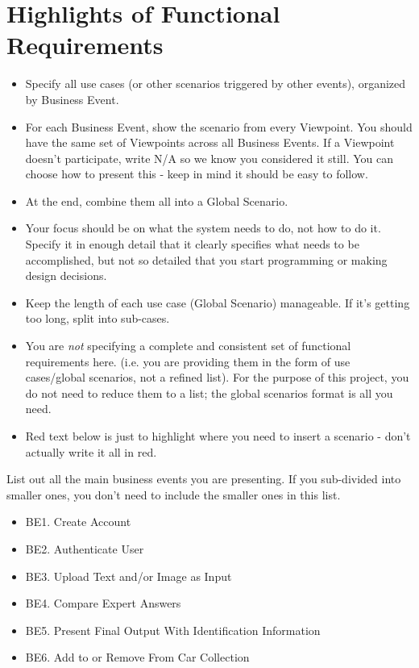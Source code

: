 \documentclass[]{article}
\begin{document}
\section{Highlights of Functional Requirements}
\label{sec:functional_requirements}
\begin{itemize}
	\item Specify all use cases (or other scenarios triggered by other events), organized by Business Event. 
	\item For each Business Event, show the scenario from every Viewpoint. You should have the same set of Viewpoints across all Business Events. If a Viewpoint doesn't participate, write N/A so we know you considered it still. You can choose how to present this - keep in mind it should be easy to follow. 
	\item At the end, combine them all into a Global Scenario.
	\item Your focus should be on what the system needs to do, not how to do it. Specify it in enough detail that it clearly specifies what needs to be accomplished, but not so detailed that you start programming or making design decisions.
	\item Keep the length of each use case (Global Scenario) manageable. If it's getting too long, split into sub-cases.
	\item You are \emph{not} specifying a complete and consistent set of functional requirements here. (i.e. you are providing them in the form of use cases/global scenarios, not a refined list). For the purpose of this project, you do not need to reduce them to a list; the global scenarios format is all you need.
	\item Red text below is just to highlight where you need to insert a scenario - don't actually write it all in red.
\end{itemize}

 List out all the main business events you are presenting. If you sub-divided into smaller ones, you don't need to include the smaller ones in this list.\\
\begin{itemize}
        \item BE1. Create Account
        \item BE2. Authenticate User
        \item BE3. Upload Text and/or Image as Input
        \item BE4. Compare Expert Answers
        \item BE5. Present Final Output With Identification Information
        \item BE6. Add to or Remove From Car Collection
\end{itemize}
\end{document}
